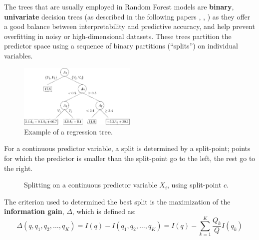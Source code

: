 The trees that are usually employed in Random Forest models are \textbf{binary}, \textbf{univariate} decision trees (as described in the following papers \cite{Cutler2011}, \cite{Bernard2009}, \cite {Geurts2006}) as they offer a good balance between interpretability and predictive accuracy, and help prevent overfitting in noisy or high-dimensional datasets. These trees partition the predictor space using a sequence of binary partitions (“splits”) on individual variables.
\begin{figure}[H] 
    \centering
    \includegraphics[width=0.5\textwidth]{Machine_learning_thesis/Images/regression tree.png}
    \caption{Example of a regression tree.} 
    \label{fig:Regression tree} 
\end{figure}
For a continuous predictor variable, a split is determined by a split-point; points for which the predictor is smaller than the split-point go to the left, the rest go to the right. 
\begin{figure}[H] 
    \centering
    \caption{Splitting on a continuous predictor variable $X_i$, using split-point $c$.} 
    \label{fig:split of a continuous variable} 
\end{figure}
The criterion used to determined the best split is the maximization of the \textbf{information gain},  $\Delta$, which is defined as: 
\begin{equation}
\Delta(q, q_1, q_2, \ldots, q_K) = I(q) - I(q_1, q_2, \ldots, q_K) = I(q) - \sum_{k=1}^{K}\frac{Q_k}{Q} I(q_k)
\end{equation}
